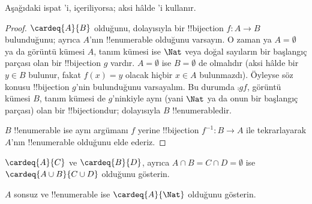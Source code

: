 \documentclass[../../../include/open-logic-section]{subfiles}
\begin{document}
\begin{editorial}
  Aşağıdaki ispat 'i, 
  içeriliyorsa; aksi hâlde 'i kullanır.
\end{editorial}

\begin{proof}
$\cardeq{A}{B}$ olduğunu, dolayısıyla bir !!{bijection} $f\colon A\to B$
bulunduğunu; ayrıca $A$'nın !!{enumerable} olduğunu varsayın.
{
  O zaman ya $A=\emptyset$ ya da görüntü kümesi $A$, tanım kümesi ise
  $\Nat$ veya doğal sayıların bir başlangıç parçası olan bir !!{bijection}
  $g$ vardır. $A=\emptyset$ ise $B=\emptyset$ de olmalıdır (aksi hâlde bir
  $y\in B$ bulunur, fakat $f(x)=y$ olacak hiçbir $x\in A$ bulunmazdı).
  Öyleyse söz konusu !!{bijection} $g$'nin bulunduğunu varsayalım. Bu durumda
  $\comp{g}{f}$, görüntü kümesi $B$, tanım kümesi de $g$'ninkiyle aynı (yani
  $\Nat$ ya da onun bir başlangıç parçası) olan bir !!{bijection}{}dur;
  dolayısıyla $B$ !!{enumerable}{}dir.}

$B$ !!{enumerable} ise aynı argümanı $f$ yerine !!{bijection}
$f^{-1}\colon B\to A$ ile tekrarlayarak $A$'nın !!{enumerable} olduğunu
elde ederiz.
\end{proof}

\begin{prob}
$\cardeq{A}{C}$ ve $\cardeq{B}{D}$, ayrıca $A\cap B=C\cap D=\emptyset$ ise
$\cardeq{A\cup B}{C\cup D}$ olduğunu gösterin.
\end{prob}

\begin{prob}
$A$ sonsuz ve !!{enumerable} ise $\cardeq{A}{\Nat}$ olduğunu gösterin.
\end{prob}
\end{document}
